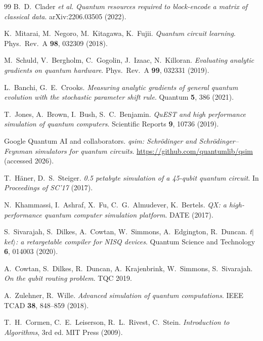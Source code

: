 \documentclass[11pt,a4paper]{article}
\begin{document}
\begin{thebibliography}{99}
  B.~D.~Clader \textit{et al.}
  \textit{Quantum resources required to block-encode a matrix of classical data}.
  arXiv:2206.03505 (2022).

  K.~Mitarai, M.~Negoro, M.~Kitagawa, K.~Fujii.
  \textit{Quantum circuit learning}.
  Phys.\ Rev.\ A \textbf{98}, 032309 (2018).

  M.~Schuld, V.~Bergholm, C.~Gogolin, J.~Izaac, N.~Killoran.
  \textit{Evaluating analytic gradients on quantum hardware}.
  Phys.\ Rev.\ A \textbf{99}, 032331 (2019).

  L.~Banchi, G.~E.~Crooks.
  \textit{Measuring analytic gradients of general quantum evolution with the
  stochastic parameter shift rule}.
  Quantum \textbf{5}, 386 (2021).

  T.~Jones, A.~Brown, I.~Bush, S.~C.~Benjamin.
  \textit{QuEST and high performance simulation of quantum computers}.
  Scientific Reports \textbf{9}, 10736 (2019).

  Google Quantum AI and collaborators.
  \textit{qsim: Schr\"odinger and Schr\"odinger--Feynman simulators for quantum
  circuits}.
  \url{https://github.com/quantumlib/qsim} (accessed 2026).

  T.~H\"aner, D.~S.~Steiger.
  \textit{0.5 petabyte simulation of a 45-qubit quantum circuit}.
  In \emph{Proceedings of SC'17} (2017).

  N.~Khammassi, I.~Ashraf, X.~Fu, C.~G.~Almudever, K.~Bertels.
  \textit{QX: a high-performance quantum computer simulation platform}.
  DATE (2017).

  S.~Sivarajah, S.~Dilkes, A.~Cowtan, W.~Simmons, A.~Edgington, R.~Duncan.
  \textit{t$|$ket$\rangle$: a retargetable compiler for NISQ devices}.
  Quantum Science and Technology \textbf{6}, 014003 (2020).

  A.~Cowtan, S.~Dilkes, R.~Duncan, A.~Krajenbrink, W.~Simmons, S.~Sivarajah.
  \textit{On the qubit routing problem}. TQC 2019.

  A.~Zulehner, R.~Wille.
  \textit{Advanced simulation of quantum computations}.
  IEEE TCAD \textbf{38}, 848--859 (2018).

  T.~H.~Cormen, C.~E.~Leiserson, R.~L.~Rivest, C.~Stein.
  \textit{Introduction to Algorithms}, 3rd ed. MIT Press (2009).


\end{thebibliography}
\end{document}
